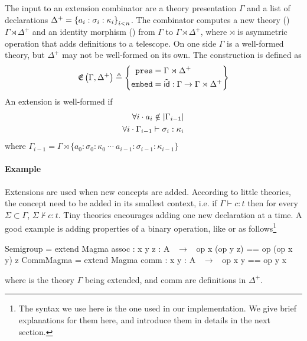 The input to an extension combinator are a theory presentation $\Gamma$ and a list of declarations $\Delta^+ = \left\{a_{i}:\sigma_{i}:\kappa_{i}\right\}_{i<n}$. 
The combinator computes a new theory () $\Gamma\rtimes\Delta^+$ and an identity morphism () from $\Gamma$ to $\Gamma\rtimes\Delta^+$, where $\rtimes$ is asymmetric operation that adds definitions to a telescope. On one side $\Gamma$ is a well-formed theory, but $\Delta^+$ may not be well-formed on its own. 
The construction is defined as
\[\mathfrak{E}\left(\Gamma, \Delta^+\right) \triangleq \left\{ \begin{aligned} \mathtt{pres} & = \Gamma \rtimes \Delta^+ \\ \mathtt{embed} & = \tilde{\mathsf{id}} : \Gamma \rightarrow \Gamma \rtimes \Delta^+ \end{aligned}\right\}\]
An extension is well-formed if 
\begin{eqnarray}
\forall i \cdot a_i \notin | \Gamma_{i-1} | \\
\forall i \cdot \Gamma_{i-1} \vdash \sigma_i : \kappa_{i}
\end{eqnarray}
where $\Gamma_{i-1} = \Gamma \rtimes \{a_0 : \sigma_0 : \kappa_0\  \cdots \ a_{i-1} : \sigma_{i-1} : \kappa_{i-1}\}$ 


\paragraph{Example}
Extensions are used when new concepts are added. According to little theories, the concept need to be added in its smallest context, i.e. if $\Gamma \vdash c : t$ then for every $\Sigma \subset \Gamma$, $\Sigma \nvdash c : t$. Tiny theories encourages adding one new declaration at a time. A good example is adding properties of a binary operation, like  or  as follows\footnote{The syntax we use here is the one used in our implementation. We give brief explanations for them here, and introduce them in details in the next section.} 
\begin{togcode}
Semigroup = extend Magma {assoc : { x y z : A } ~$\to$~ op x (op y z) ==
                                                   op (op x y) z } 
CommMagma = extend Magma {comm  : { x y : A } ~$\to$~ op x y == op y x }
\end{togcode} 
where  is the theory $\Gamma$ being extended,  and {comm} are definitions in $\Delta^+$. 

